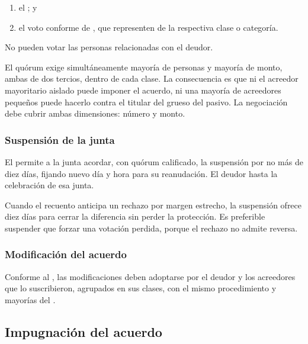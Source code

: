 \begin{enumerate}
  \item el ; y
  \item el voto conforme de , que
  representen  de la
  respectiva clase o categoría.
\end{enumerate}

No pueden votar las personas relacionadas con el deudor.

\begin{foco}
El quórum exige simultáneamente mayoría de personas y mayoría de monto, ambas de dos
tercios, dentro de cada clase. La consecuencia es que ni el acreedor mayoritario aislado
puede imponer el acuerdo, ni una mayoría de acreedores pequeños puede hacerlo contra el
titular del grueso del pasivo. La negociación debe cubrir ambas dimensiones: número y monto.
\end{foco}

\subsubsection{Suspensión de la junta}

El  permite a la junta acordar, con quórum calificado, la suspensión por no más de
diez días, fijando nuevo día y hora para su reanudación. El deudor  hasta la celebración de esa junta.

\begin{practica}
Cuando el recuento anticipa un rechazo por margen estrecho, la suspensión ofrece diez días
para cerrar la diferencia sin perder la protección. Es preferible suspender que forzar una
votación perdida, porque el rechazo no admite reversa.
\end{practica}

\subsubsection{Modificación del acuerdo}

Conforme al , las modificaciones deben adoptarse por el deudor y los acreedores que
lo suscribieron, agrupados en sus clases, con el mismo procedimiento y mayorías del .

\subsection{Impugnación del acuerdo}

